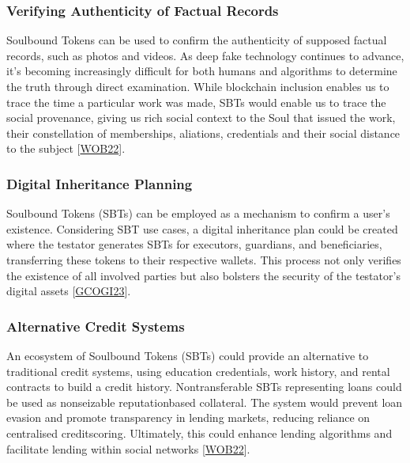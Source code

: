 \documentclass[letterpaper,10pt,english]{jupyterBook}
\begin{document}
\subsubsection{Verifying Authenticity of Factual Records}
\label{\detokenize{SBT/SBT:verifying-authenticity-of-factual-records}}
\sphinxAtStartPar
Soulbound Tokens can be used to confirm the authenticity of supposed factual records, such as photos and videos. As deep fake technology continues to advance, it’s becoming increasingly difficult for both humans and algorithms to determine the truth through direct examination. While blockchain inclusion enables us to trace the time a particular work was made, SBTs would enable us to trace the social provenance, giving us rich social context to the Soul that issued the work, their constellation of memberships, aliations, credentials and their social distance to the subject {[}\hyperlink{cite.SBT/SBT:id86}{WOB22}{]}.


\subsubsection{Digital Inheritance Planning}
\label{\detokenize{SBT/SBT:digital-inheritance-planning}}
\sphinxAtStartPar
Soulbound Tokens (SBTs) can be employed as a mechanism to confirm a user’s existence. Considering SBT use cases, a digital inheritance plan could be created where the testator generates SBTs for executors, guardians, and beneficiaries, transferring these tokens to their respective wallets. This process not only verifies the existence of all involved parties but also bolsters the security of the testator’s digital assets {[}\hyperlink{cite.SBT/SBT:id81}{GCOGI23}{]}.


\subsubsection{Alternative Credit Systems}
\label{\detokenize{SBT/SBT:alternative-credit-systems}}
\sphinxAtStartPar
An ecosystem of Soulbound Tokens (SBTs) could provide an alternative to traditional credit systems, using education credentials, work history, and rental contracts to build a credit history. Non\sphinxhyphen{}transferable SBTs representing loans could be used as non\sphinxhyphen{}seizable reputation\sphinxhyphen{}based collateral. The system would prevent loan evasion and promote transparency in lending markets, reducing reliance on centralised credit\sphinxhyphen{}scoring. Ultimately, this could enhance lending algorithms and facilitate lending within social networks {[}\hyperlink{cite.SBT/SBT:id86}{WOB22}{]}.
\end{document}
